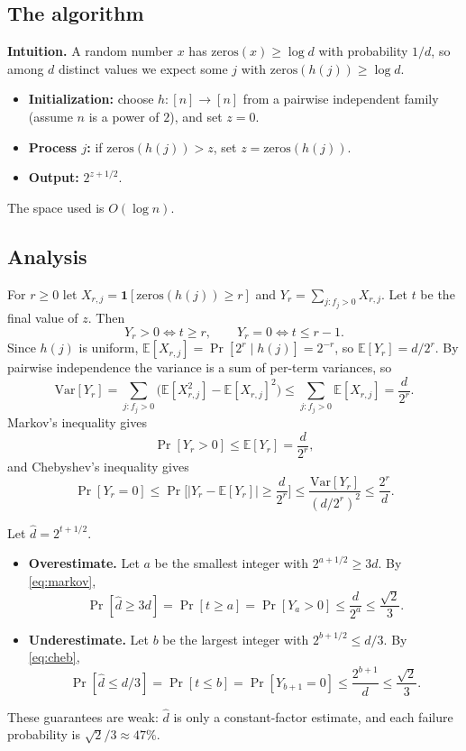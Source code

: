 \subsection{The algorithm}
 
\textbf{Intuition.} A random number $x$ has $\mathrm{zeros}(x)\ge\log d$ with probability $1/d$, so among $d$ distinct values we expect some $j$ with $\mathrm{zeros}(h(j))\ge\log d$.
\begin{itemize}
  \item \textbf{Initialization:} choose $h:[n]\to[n]$ from a pairwise independent family (assume $n$ is a power of $2$), and set $z=0$.
  \item \textbf{Process $j$:} if $\mathrm{zeros}(h(j))>z$, set $z=\mathrm{zeros}(h(j))$.
  \item \textbf{Output:} $2^{z+1/2}$.
\end{itemize}
The space used is $O(\log n)$.
 
\subsection{Analysis}
 
For $r\ge0$ let $X_{r,j}=\mathbf 1[\mathrm{zeros}(h(j))\ge r]$ and $Y_r=\sum_{j:f_j>0}X_{r,j}$. Let $t$ be the final value of $z$. Then
\[
  Y_r>0\iff t\ge r,\qquad Y_r=0\iff t\le r-1.
\]
Since $h(j)$ is uniform, $\mathbb E[X_{r,j}]=\Pr[2^r\mid h(j)]=2^{-r}$, so $\mathbb E[Y_r]=d/2^r$. By pairwise independence the variance is a sum of per-term variances, so
\[
  \mathrm{Var}[Y_r]=\sum_{j:f_j>0}\big(\mathbb E[X_{r,j}^2]-\mathbb E[X_{r,j}]^2\big)\le\sum_{j:f_j>0}\mathbb E[X_{r,j}]=\frac d{2^r}.
\]
Markov's inequality gives
\begin{equation}\label{eq:markov}
  \Pr[Y_r>0]\le\mathbb E[Y_r]=\frac d{2^r},
\end{equation}
and Chebyshev's inequality gives
\begin{equation}\label{eq:cheb}
  \Pr[Y_r=0]\le\Pr\Big[|Y_r-\mathbb E[Y_r]|\ge\frac d{2^r}\Big]\le\frac{\mathrm{Var}[Y_r]}{(d/2^r)^2}\le\frac{2^r}d.
\end{equation}
 
Let $\hat d=2^{t+1/2}$.
\begin{itemize}
  \item \textbf{Overestimate.} Let $a$ be the smallest integer with $2^{a+1/2}\ge3d$. By \eqref{eq:markov},
  \[
    \Pr[\hat d\ge3d]=\Pr[t\ge a]=\Pr[Y_a>0]\le\frac d{2^a}\le\frac{\sqrt2}3.
  \]
  \item \textbf{Underestimate.} Let $b$ be the largest integer with $2^{b+1/2}\le d/3$. By \eqref{eq:cheb},
  \[
    \Pr[\hat d\le d/3]=\Pr[t\le b]=\Pr[Y_{b+1}=0]\le\frac{2^{b+1}}d\le\frac{\sqrt2}3.
  \]
\end{itemize}
These guarantees are weak: $\hat d$ is only a constant-factor estimate, and each failure probability is $\sqrt2/3\approx47\%$.
 
